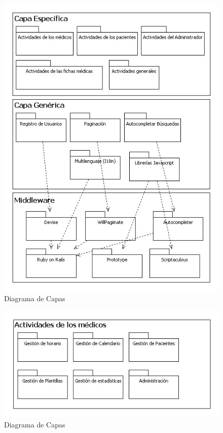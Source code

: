 \documentclass[a4paper,oneside,11pt]{book}
\begin{document}
		\begin{figure}[H]
		  \centering
		    \includegraphics[width=16cm]{img/jpg/dcapas/capas.jpg}
		  \caption{Diagrama de Capas}
		  \label{fig:dcapas}
		\end{figure}
		
		
		
		\begin{figure}[H]
		  \centering
		    \includegraphics[width=12cm]{img/jpg/dcapas/Actividades_medicos.jpg}
		  \caption{Diagrama de Capas}
		  \label{fig:dcapas_medicos}
		\end{figure}
		
\end{document}
